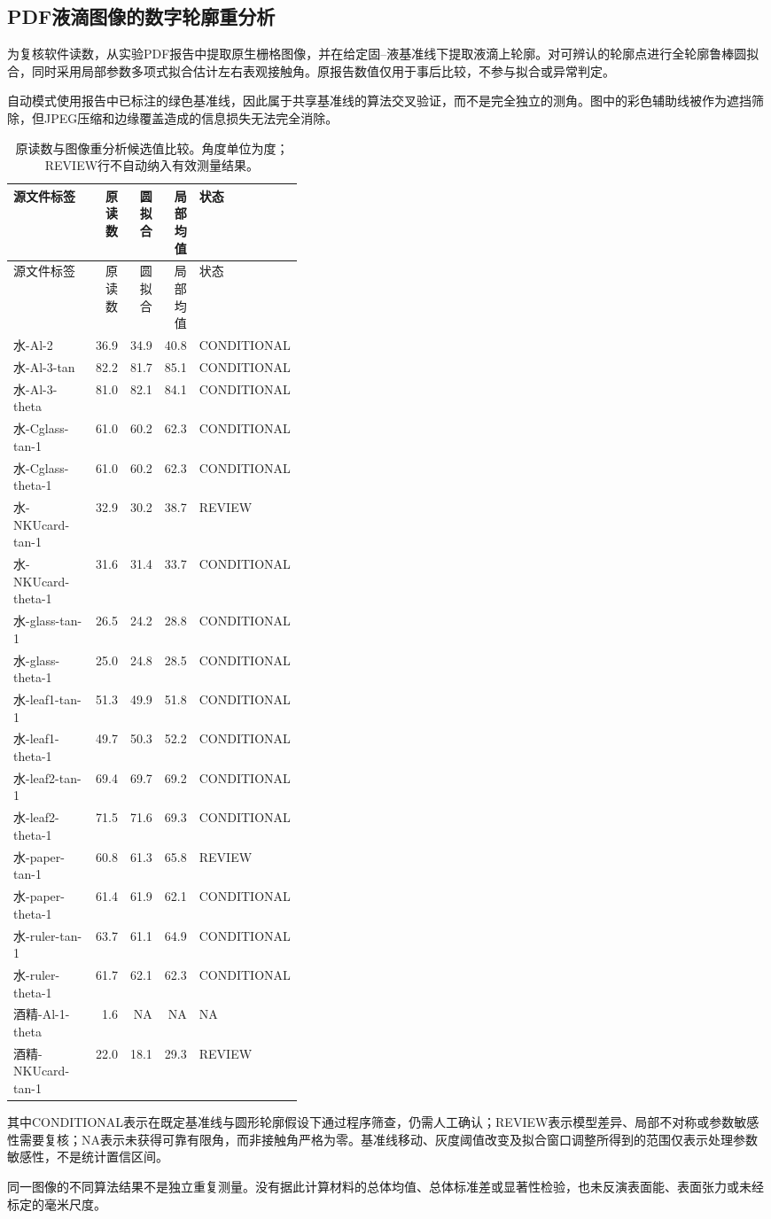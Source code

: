 \subsection{PDF液滴图像的数字轮廓重分析}
为复核软件读数，从实验PDF报告中提取原生栅格图像，并在给定固--液基准线下提取液滴上轮廓。对可辨认的轮廓点进行全轮廓鲁棒圆拟合，同时采用局部参数多项式拟合估计左右表观接触角。原报告数值仅用于事后比较，不参与拟合或异常判定。

自动模式使用报告中已标注的绿色基准线，因此属于共享基准线的算法交叉验证，而不是完全独立的测角。图中的彩色辅助线被作为遮挡筛除，但JPEG压缩和边缘覆盖造成的信息损失无法完全消除。

\begingroup\small
\setlength{\tabcolsep}{4pt}
\begin{longtable}{p{0.38\linewidth}rrrl}
\caption{原读数与图像重分析候选值比较。角度单位为度；REVIEW行不自动纳入有效测量结果。}\\
\toprule 源文件标签 & 原读数 & 圆拟合 & 局部均值 & 状态\\\midrule
\endfirsthead
\toprule 源文件标签 & 原读数 & 圆拟合 & 局部均值 & 状态\\\midrule
\endhead
水-Al-2 & 36.9 & 34.9 & 40.8 & CONDITIONAL \\
水-Al-3-tan & 82.2 & 81.7 & 85.1 & CONDITIONAL \\
水-Al-3-theta & 81.0 & 82.1 & 84.1 & CONDITIONAL \\
水-Cglass-tan-1 & 61.0 & 60.2 & 62.3 & CONDITIONAL \\
水-Cglass-theta-1 & 61.0 & 60.2 & 62.3 & CONDITIONAL \\
水-NKUcard-tan-1 & 32.9 & 30.2 & 38.7 & REVIEW \\
水-NKUcard-theta-1 & 31.6 & 31.4 & 33.7 & CONDITIONAL \\
水-glass-tan-1 & 26.5 & 24.2 & 28.8 & CONDITIONAL \\
水-glass-theta-1 & 25.0 & 24.8 & 28.5 & CONDITIONAL \\
水-leaf1-tan-1 & 51.3 & 49.9 & 51.8 & CONDITIONAL \\
水-leaf1-theta-1 & 49.7 & 50.3 & 52.2 & CONDITIONAL \\
水-leaf2-tan-1 & 69.4 & 69.7 & 69.2 & CONDITIONAL \\
水-leaf2-theta-1 & 71.5 & 71.6 & 69.3 & CONDITIONAL \\
水-paper-tan-1 & 60.8 & 61.3 & 65.8 & REVIEW \\
水-paper-theta-1 & 61.4 & 61.9 & 62.1 & CONDITIONAL \\
水-ruler-tan-1 & 63.7 & 61.1 & 64.9 & CONDITIONAL \\
水-ruler-theta-1 & 61.7 & 62.1 & 62.3 & CONDITIONAL \\
酒精-Al-1-theta & 1.6 & NA & NA & NA \\
酒精-NKUcard-tan-1 & 22.0 & 18.1 & 29.3 & REVIEW \\
\bottomrule\end{longtable}\endgroup

其中CONDITIONAL表示在既定基准线与圆形轮廓假设下通过程序筛查，仍需人工确认；REVIEW表示模型差异、局部不对称或参数敏感性需要复核；NA表示未获得可靠有限角，而非接触角严格为零。基准线移动、灰度阈值改变及拟合窗口调整所得到的范围仅表示处理参数敏感性，不是统计置信区间。

同一图像的不同算法结果不是独立重复测量。没有据此计算材料的总体均值、总体标准差或显著性检验，也未反演表面能、表面张力或未经标定的毫米尺度。
